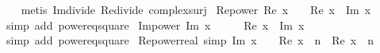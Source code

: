 \begin{isabellebody}
%
\isadelimproof
\ \ %
\endisadelimproof
%
\isatagproof
{}\isamarkupfalse%
\ {\isacharparenleft}{\kern0pt}metis\ Im{\isacharunderscore}{\kern0pt}divide\ Re{\isacharunderscore}{\kern0pt}divide\ complex{\isacharunderscore}{\kern0pt}surj{\isacharparenright}{\kern0pt}%
\endisatagproof
{\isafoldproof}%
%
\isadelimproof
\isanewline
%
\endisadelimproof
\isanewline
{}\isamarkupfalse%
\ Re{\isacharunderscore}{\kern0pt}power{}{\isacharcolon}{\kern0pt}\ {\isachardoublequoteopen}Re\ {\isacharparenleft}{\kern0pt}x\ {\isacharcircum}{\kern0pt}\ {}{\isacharparenright}{\kern0pt}\ {\isacharequal}{\kern0pt}\ {\isacharparenleft}{\kern0pt}Re\ x{\isacharparenright}{\kern0pt}{\isacharcircum}{\kern0pt}{}\ {\isacharminus}{\kern0pt}\ {\isacharparenleft}{\kern0pt}Im\ x{\isacharparenright}{\kern0pt}{\isacharcircum}{\kern0pt}{}{\isachardoublequoteclose}\isanewline
%
\isadelimproof
\ \ %
\endisadelimproof
%
\isatagproof
{}\isamarkupfalse%
\ {\isacharparenleft}{\kern0pt}simp\ add{\isacharcolon}{\kern0pt}\ power{}{\isacharunderscore}{\kern0pt}eq{\isacharunderscore}{\kern0pt}square{\isacharparenright}{\kern0pt}%
\endisatagproof
{\isafoldproof}%
%
\isadelimproof
\isanewline
%
\endisadelimproof
\isanewline
{}\isamarkupfalse%
\ Im{\isacharunderscore}{\kern0pt}power{}{\isacharcolon}{\kern0pt}\ {\isachardoublequoteopen}Im\ {\isacharparenleft}{\kern0pt}x\ {\isacharcircum}{\kern0pt}\ {}{\isacharparenright}{\kern0pt}\ {\isacharequal}{\kern0pt}\ {}\ {\isacharasterisk}{\kern0pt}\ Re\ x\ {\isacharasterisk}{\kern0pt}\ Im\ x{\isachardoublequoteclose}\isanewline
%
\isadelimproof
\ \ %
\endisadelimproof
%
\isatagproof
{}\isamarkupfalse%
\ {\isacharparenleft}{\kern0pt}simp\ add{\isacharcolon}{\kern0pt}\ power{}{\isacharunderscore}{\kern0pt}eq{\isacharunderscore}{\kern0pt}square{\isacharparenright}{\kern0pt}%
\endisatagproof
{\isafoldproof}%
%
\isadelimproof
\isanewline
%
\endisadelimproof
\isanewline
{}\isamarkupfalse%
\ Re{\isacharunderscore}{\kern0pt}power{\isacharunderscore}{\kern0pt}real\ {\isacharbrackleft}{\kern0pt}simp{\isacharbrackright}{\kern0pt}{\isacharcolon}{\kern0pt}\ {\isachardoublequoteopen}Im\ x\ {\isacharequal}{\kern0pt}\ {}\ {\isasymLongrightarrow}\ Re\ {\isacharparenleft}{\kern0pt}x\ {\isacharcircum}{\kern0pt}\ n{\isacharparenright}{\kern0pt}\ {\isacharequal}{\kern0pt}\ Re\ x\ {\isacharcircum}{\kern0pt}\ n\ {\isachardoublequoteclose}\isanewline
%
\isadelimproof
\ \ %
\endisadelimproof

\end{isabellebody}
